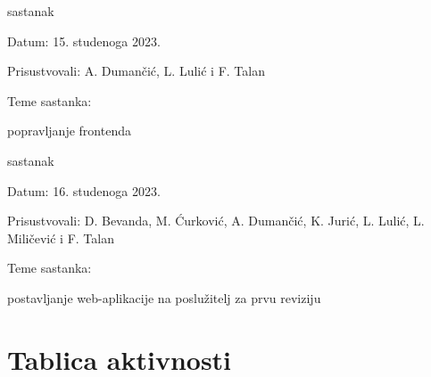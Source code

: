 \begin{packed_enum}
			\item  sastanak
			\item[] \begin{packed_item}
				\item Datum: 15. studenoga 2023.
				\item Prisustvovali: A. Dumančić, L. Lulić i F. Talan
				\item Teme sastanka:
				\begin{packed_item}
					\item popravljanje frontenda
				\end{packed_item}
			\end{packed_item}

			\item  sastanak
			\item[] \begin{packed_item}
				\item Datum: 16. studenoga 2023.
				\item Prisustvovali: D. Bevanda, M. Ćurković, A. Dumančić, K. Jurić, L. Lulić, L. Miličević i F. Talan
				\item Teme sastanka:
				\begin{packed_item}
					\item postavljanje web-aplikacije na poslužitelj za prvu reviziju
				\end{packed_item}
			\end{packed_item}


		\end{packed_enum}

		\eject
		\section*{Tablica aktivnosti}


